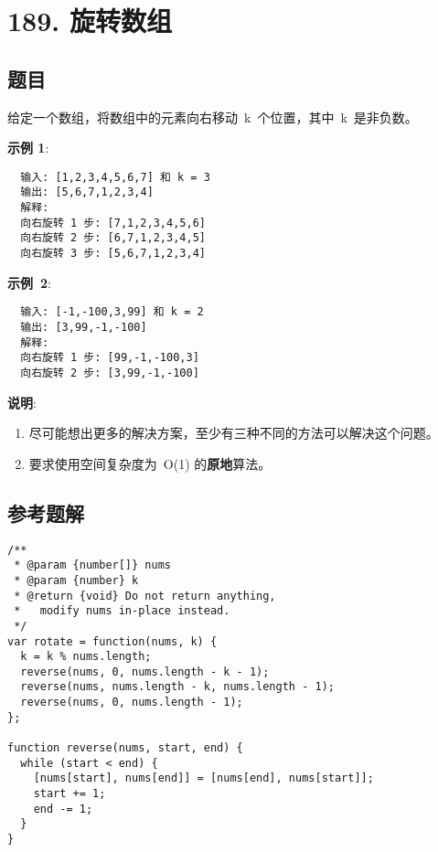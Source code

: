 \newpage
\section{189. 旋转数组}
\label{leetcode:189}

\subsection{题目}

给定一个数组，将数组中的元素向右移动 k 个位置，其中 k 是非负数。

\textbf{示例 1}:

\begin{verbatim}
  输入: [1,2,3,4,5,6,7] 和 k = 3
  输出: [5,6,7,1,2,3,4]
  解释:
  向右旋转 1 步: [7,1,2,3,4,5,6]
  向右旋转 2 步: [6,7,1,2,3,4,5]
  向右旋转 3 步: [5,6,7,1,2,3,4]
\end{verbatim}

\textbf{示例 2}:

\begin{verbatim}
  输入: [-1,-100,3,99] 和 k = 2
  输出: [3,99,-1,-100]
  解释: 
  向右旋转 1 步: [99,-1,-100,3]
  向右旋转 2 步: [3,99,-1,-100]
\end{verbatim}

\textbf{说明}:

\begin{enumerate}
  \item 尽可能想出更多的解决方案，至少有三种不同的方法可以解决这个问题。
  \item 要求使用空间复杂度为 O(1) 的\textbf{原地}算法。
\end{enumerate}

\subsection{参考题解}

\begin{verbatim}
/**
 * @param {number[]} nums
 * @param {number} k
 * @return {void} Do not return anything, 
 *   modify nums in-place instead.
 */
var rotate = function(nums, k) {
  k = k % nums.length;
  reverse(nums, 0, nums.length - k - 1);
  reverse(nums, nums.length - k, nums.length - 1);
  reverse(nums, 0, nums.length - 1);
};

function reverse(nums, start, end) {
  while (start < end) {
    [nums[start], nums[end]] = [nums[end], nums[start]];
    start += 1;
    end -= 1;
  }
}
\end{verbatim}
